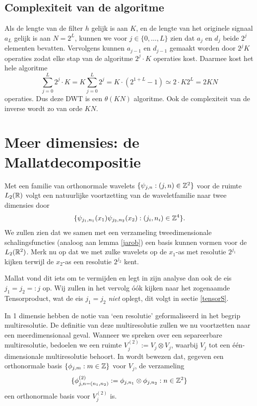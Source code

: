 \subsection{Complexiteit van de algoritme}
Als de lengte van de filter $h$ gelijk is aan $K$, en de lengte van het originele signaal $a_L$ 
gelijk is aan $N = 2^{L}$,
 kunnen we voor $j \in \{0, \ldots, L\}$ zien dat $a_j$ en $d_j$ beide $2^{j}$ elementen bevatten. 
Vervolgens kunnen $a_{j-1}$ en $d_{j-1}$ gemaakt worden door $2^{j}K$ operaties zodat elke stap van de algoritme 
$2^{j} \cdot K$ operaties kost. 
Daarmee kost het hele algoritme
\[
\sum_{j=0}^L 2^{j} \cdot K = K \sum_{j=0}^L 2^{j} = K \cdot (2^{1+L} - 1) \simeq 2 \cdot K 2^{L} = 2KN
\]
operaties. Dus deze DWT is een $\theta(KN)$ algoritme. 
Ook de complexiteit van de inverse wordt zo van orde $KN$.

\section{Meer dimensies: de Mallatdecompositie}
Met een familie van orthonormale wavelets $\{ \psi_{j,n}: (j,n) \in \mathbb{Z}^2\}$ voor de ruimte $L_2(\mathbb{R})$ volgt een natuurlijke voortzetting
van de waveletfamilie naar twee dimensies door
\[
\{ \psi_{j_1,n_1}(x_1) \psi_{j_2,n_2}(x_2): (j_i,n_i) \in \mathbb{Z}^4 \}.
\]
We zullen zien dat we samen met een verzameling tweedimensionale schalingsfuncties (analoog aan lemma \ref{jarob}) een basis kunnen vormen voor de $L_2(\mathbb{R}^2)$.
Merk nu op dat we met zulke wavelets op de $x_1$-as met resolutie $2^{j_1}$ kijken 
terwijl de $x_2$-as een resolutie $2^{j_2}$ kent.

Mallat vond dit iets om te vermijden \cite[\S 7.7]{mallat} en legt in zijn analyse dan ook de eis $j_1 = j_2 =: j$ op. 
Wij zullen in het vervolg \'o\'ok kijken naar het zogenaamde Tensorproduct, wat de eis $j_1 = j_2$ \emph{niet} oplegt,
dit volgt in sectie \ref{tensorS}.

In 1 dimensie hebben de notie van `een resolutie' geformaliseerd in het begrip multiresolutie.
De definitie van deze multiresolutie zullen we nu voortzetten naar een meerdimensionaal geval. 
Wanneer we spreken over een separeerbare multiresolutie, bedoelen we een ruimte $V_j^{(2)} := V_j \otimes V_j$,
waarbij $V_j$ tot een \'e\'en-dimensionale multiresolutie behoort.
In \cite[A.5]{mallat} wordt bewezen dat, gegeven een orthonormale basis $\{ \phi_{j,m}: m \in \mathbb{Z} \}$ voor $V_j$, de verzameling
\begin{equation}
  \label{phi_phi_basis}
  \{ \phi^{(2)}_{j,n=(n_1,n_2)} := \phi_{j,n_1} \otimes \phi_{j,n_2}: n \in \mathbb{Z}^2 \}
\end{equation}
een orthonormale basis voor $V_j^{(2)}$ is.

